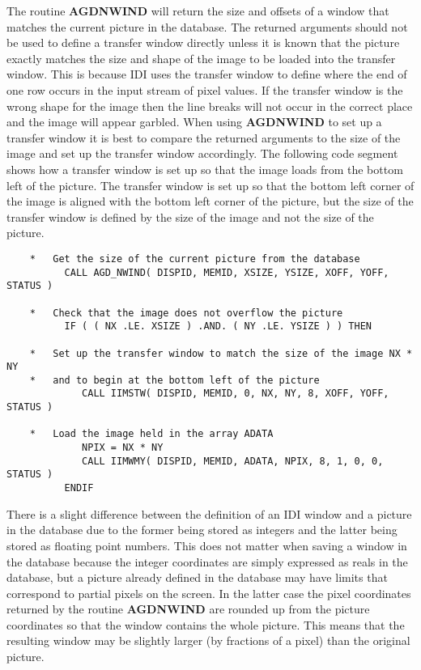 \documentclass[twoside,11pt]{article}
\newcommand{\htmlref}[2]{#1}
\renewcommand{\_}{\texttt{\symbol{95}}}
\begin{document}
The routine \htmlref{{\bf AGD\_NWIND}}{AGD_NWIND}
will return the size and offsets of a window that
matches the current picture in the database. The returned arguments should
not be used to define a transfer window directly unless it is known that
the picture exactly matches the size and shape of the image to be loaded
into the transfer window. This is because IDI uses the transfer window to
define where the end of one row occurs in the input stream of pixel values.
If the transfer window is the wrong shape for the image then the line
breaks will not occur in the correct place and the image will appear
garbled. When using {\bf AGD\_NWIND} to set up a transfer window it is best
to compare the returned arguments to the size of the image and set up the
transfer window accordingly. The following code segment shows how a
transfer window is set up so that the image loads from the bottom left of
the picture. The transfer window is set up so that the bottom left corner
of the image is aligned with the bottom left corner of the picture, but the
size of the transfer window is defined by the size of the image and not the
size of the picture.
\begin{verbatim}
    *   Get the size of the current picture from the database
          CALL AGD_NWIND( DISPID, MEMID, XSIZE, YSIZE, XOFF, YOFF, STATUS )

    *   Check that the image does not overflow the picture
          IF ( ( NX .LE. XSIZE ) .AND. ( NY .LE. YSIZE ) ) THEN

    *   Set up the transfer window to match the size of the image NX * NY
    *   and to begin at the bottom left of the picture
             CALL IIMSTW( DISPID, MEMID, 0, NX, NY, 8, XOFF, YOFF, STATUS )

    *   Load the image held in the array ADATA
             NPIX = NX * NY
             CALL IIMWMY( DISPID, MEMID, ADATA, NPIX, 8, 1, 0, 0, STATUS )
          ENDIF
\end{verbatim}
There is a slight difference between the definition of an IDI window and
a picture in the database due to the former being stored as integers and
the latter being stored as floating point numbers. This does not matter
when saving a window in the database because the integer coordinates are
simply expressed as reals in the database, but a picture already defined in
the database may have limits that correspond to partial pixels on the screen.
In the latter case the pixel coordinates returned by the routine
{\bf AGD\_NWIND} are rounded up from the picture coordinates so that the
window contains the whole picture. This means that the resulting window
may be slightly larger (by fractions of a pixel) than the original picture.
\end{document}
